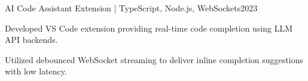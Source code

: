 \begin{cvproject}{AI Code Assistant Extension | TypeScript, Node.js, WebSockets}{2023}
    \item Developed VS Code extension providing real-time code completion using LLM API backends.
    \item Utilized debounced WebSocket streaming to deliver inline completion suggestions with low latency.
\end{cvproject}
